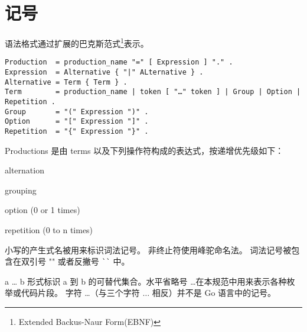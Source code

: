 
\chapter{记号}
语法格式通过扩展的巴克斯范式\footnote{Extended Backus-Naur Form(EBNF)}表示。
\begin{lstlisting}[style=EBNF]
Production	= production_name "=" [ Expression ] "." .
Expression 	= Alternative { "|" ALternative } .
Alternative = Term { Term } .
Term        = production_name | token [ "…" token ] | Group | Option | Repetition .
Group       = "(" Expression ")" .
Option      = "[" Expression "]" .
Repetition  = "{" Expression "}" .
\end{lstlisting}

Productions 是由 terms 以及下列操作符构成的表达式，按递增优先级如下：
\begin{description}[font=\ttfamily\bfseries, style=nextline, leftmargin=2\parindent, labelindent=\parindent]
	\item [|] alternation
	\item [()] grouping
	\item [{[]}] option (0 or 1 times)
	\item [\{\}] repetition (0 to n times)
\end{description}
小写的产生式名被用来标识词法记号。
非终止符使用峰驼命名法。
词法记号被包含在双引号 "" 或者反撇号 \lstinline|``| 中。

 a \dots{} b 形式标识 a 到 b 的可替代集合。水平省略号 \dots 在本规范中用来表示各种枚举或代码片段。
 字符 \dots（与三个字符 $\ldots$ 相反）并不是 Go 语言中的记号。